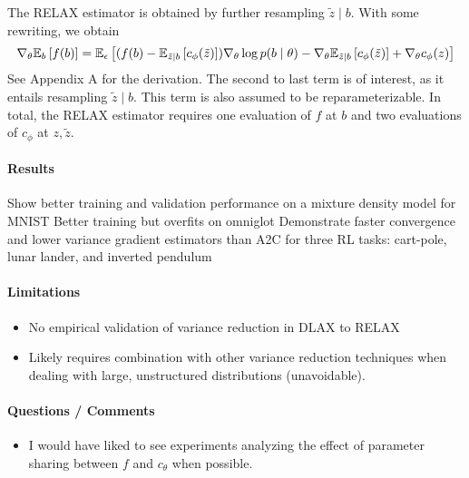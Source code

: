 The RELAX estimator is obtained by further resampling $\tilde{z}\mid b$.
With some rewriting, we obtain
\begin{equation}
\nabla_\theta \mathbb{E}_{b}\left[f(b)\right]
= \mathbb{E}_{\epsilon}\left[(f(b) - \mathbb{E}_{\tilde{z}\mid b}\left[c_\phi(\tilde{z})\right])\nabla_\theta \log p(b\mid\theta)
- \nabla_\theta\mathbb{E}_{\tilde{z}\mid b}\left[ c_\phi(\tilde{z})\right] + \nabla_\theta c_\phi(z)\right]
\end{equation}
See Appendix A for the derivation.
The second to last term is of interest, as it entails resampling $\tilde{z} \mid b$.
This term is also assumed to be reparameterizable.
In total, the RELAX estimator requires one evaluation of $f$
at $b$ and two evaluations of $c_\phi$ at $z,\tilde{z}$.

\paragraph{Results}
Show better training and validation performance on a mixture density model for MNIST
Better training but overfits on omniglot
Demonstrate faster convergence and lower variance gradient estimators than
A2C for three RL tasks: cart-pole, lunar lander, and inverted pendulum

\paragraph{Limitations}
\begin{itemize}
\item No empirical validation of variance reduction in DLAX to RELAX
\item Likely requires combination with other variance reduction techniques when dealing with
    large, unstructured distributions (unavoidable).
\end{itemize}

\paragraph{Questions / Comments}
\begin{itemize}
\item I would have liked to see experiments analyzing the effect of parameter sharing between
$f$ and $c_\theta$ when possible.
\end{itemize}

